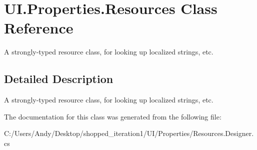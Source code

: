 \hypertarget{class_u_i_1_1_properties_1_1_resources}{
\section{UI.Properties.Resources Class Reference}
\label{class_u_i_1_1_properties_1_1_resources}
}


A strongly-\/typed resource class, for looking up localized strings, etc.  


\subsection{Detailed Description}
A strongly-\/typed resource class, for looking up localized strings, etc. 

The documentation for this class was generated from the following file:\begin{DoxyCompactItemize}
\item 
C:/Users/Andy/Desktop/shopped\_\-iteration1/UI/Properties/Resources.Designer.cs\end{DoxyCompactItemize}
